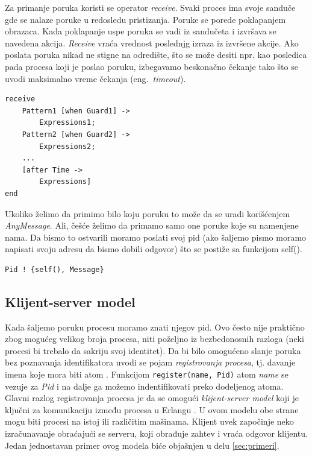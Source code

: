 \documentclass[a4paper]{article}
\begin{document}
{%
Za primanje poruka koristi se operator {\em receive}. 
Svaki proces ima svoje sanduče gde se nalaze poruke u redosledu pristizanja. 
Poruke se porede poklapanjem obrazaca. 
Kada poklapanje uspe poruka se vadi iz sandučeta i izvršava se navedena akcija. 
{\em Receive} vraća vrednost poslednjg izraza iz izvršene akcije.
Ako poslata poruka nikad ne stigne na odredište, što se može desiti npr. kao posledica pada procesa koji je poslao poruku, izbegavamo beskonačno čekanje tako što se uvodi maksimalno vreme čekanja (eng.~{\em timeout}).
\begin{verbatim}
receive
    Pattern1 [when Guard1] ->
        Expressions1;
    Pattern2 [when Guard2] ->
        Expressions2;
	... 
	[after Time -> 
		Expressions]
end
\end{verbatim}

Ukoliko želimo da primimo bilo koju poruku to može da se uradi korišćenjem {\em AnyMessage}. 
Ali, češće želimo da primamo samo one poruke koje su namenjene nama. 
Da bismo to ostvarili moramo poslati svoj pid 
(ako šaljemo pismo moramo napisati svoju adresu da bismo dobili odgovor) 
što se postiže sa funkcijom self().
\begin{verbatim}
Pid ! {self(), Message}
\end{verbatim}

\subsection{Klijent-server model}
\label{sec:ksmodel}
Kada šaljemo poruku procesu moramo znati njegov pid. 
Ovo često nije praktično zbog mogućeg velikog broja procesa, niti poželjno iz bezbedonosnih razloga 
(neki procesi bi trebalo da sakriju svoj identitet). 
Da bi bilo omogućeno slanje poruka bez poznavanja identifikatora uvodi se pojam {\em registrovanja procesa}, tj. davanje imena koje mora biti atom \cite{book_joe, phdthesis}.
Funkcijom {\texttt{register(name, Pid)}} atom {\em name} se vezuje za {\em Pid} i na dalje ga možemo indentifikovati preko dodeljenog atoma.\\

Glavni razlog registrovanja procesa je da se omogući {\em klijent-server model} koji je ključni za komunikaciju između procesa u Erlangu \cite{book_concurrent, book_joe, phdthesis}.
U ovom modelu obe strane mogu biti procesi na istoj ili različitim mašinama. 
Klijent uvek započinje neko izračunavanje obraćajući se serveru, 
koji obrađuje zahtev i vraća odgovor klijentu. Jedan jednostavan primer ovog modela biće objašnjen u delu \ref{sec:primeri}.

}
\end{document}
